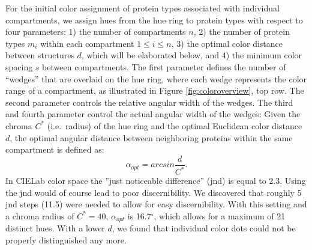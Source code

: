 \documentclass{egpubl}
\begin{document}
	For the initial color assignment of protein types associated with individual compartments, we assign hues from the hue ring to protein types with respect to four parameters: 
	1) the number of compartments $n$, 2) the number of protein types $m_i$ within each compartment $1 \leq i \leq n$, 3) the optimal color distance between structures $d$, which will be elaborated below, and 4) the minimum color spacing $s$ between compartments. 
	The first parameter defines the number of ``wedges'' that are overlaid on the hue ring, where each wedge represents the color range of a compartment, as illustrated in Figure \ref{fig:coloroverview}, top row. 
	The second parameter controls the relative angular width of the wedges. 
	The third and fourth parameter control the actual angular width of the wedges: 
	Given the chroma $C^*$ (i.e.\, radius) of the hue ring and the optimal Euclidean color distance $d$, the optimal angular distance between neighboring proteins within the same compartment is defined as: 
	\begin{equation}%
	\alpha_{opt} = arcsin\frac{d}{C^*}. %
	\end{equation}%
	In CIELab color space the ''just noticeable difference'' (jnd) is equal to 2.3\cite{lee2013perceptually}.
	Using the jnd would of course lead to poor discernibility. 
	We discovered that roughly 5 jnd steps (11.5) were needed to allow for easy discernibility. 
	With this setting and a chroma radius of $C^*=40$, $\alpha_{opt}$ is 16.7$^{\circ}$, which allows for a maximum of 21 distinct hues. 
	With a lower $d$, we found that individual color dots could not be properly distinguished any more. 
\end{document}
